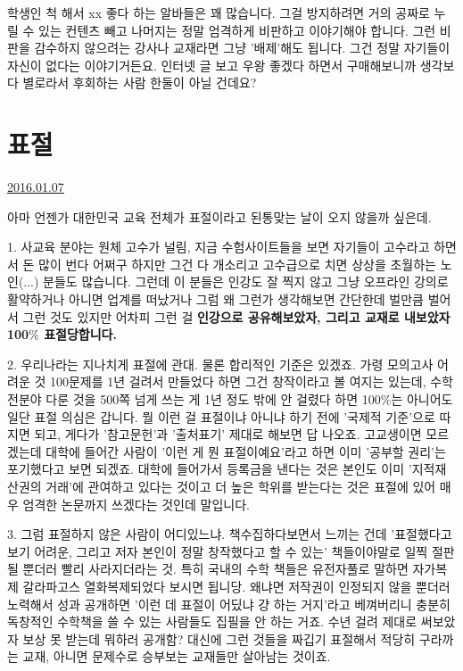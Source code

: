 학생인 척 해서 xx 좋다 하는 알바들은 꽤 많습니다.
그걸 방지하려면 거의 공짜로 누릴 수 있는 컨텐츠 빼고 나머지는 정말 엄격하게 비판하고 이야기해야 합니다.
그런 비판을 감수하지 않으려는 강사나 교재라면 그냥 '배제'해도 됩니다. 그건 정말 자기들이 자신이 없다는 이야기거든요.
인터넷 글 보고 우왕 좋겠다 하면서 구매해보니까 생각보다 별로라서 후회하는 사람 한둘이 아닐 건데요?
\vspace{5mm}








\section{표절}
\href{https://www.kockoc.com/Apoc/578553}{2016.01.07}

\vspace{5mm}

아마 언젠가 대한민국 교육 전체가 표절이라고 된통맞는 날이 오지 않을까 싶은데.
\vspace{5mm}

\item 1. 사교육 분야는 원체 고수가 널림,
지금 수험사이트들을 보면 자기들이 고수라고 하면서 돈 많이 번다 어쩌구 하지만 그건 다 개소리고
고수급으로 치면 상상을 초월하는 노인(...) 분들도 많습니다.
그런데 이 분들은 인강도 잘 찍지 않고 그냥 오프라인 강의로 활약하거나 아니면 업계를 떠났거나 그럼
왜 그런가 생각해보면 간단한데
벌만큼 벌어서 그런 것도 있지만
어차피 그런 걸 \textbf{인강으로 공유해보았자, 그리고 교재로 내보았자 100$\%$ 표절당합니다.}
\vspace{5mm}

\item 2. 우리나라는 지나치게 표절에 관대.
물론 합리적인 기준은 있겠죠.
가령 모의고사 어려운 것 100문제를 1년 걸려서 만들었다 하면 그건 창작이라고 볼 여지는 있는데,
수학 전분야 다룬 것을 500쪽 넘게 쓰는 게 1년 정도 밖에 안 걸렸다 하면 100$\%$는 아니어도 일단 표절 의심은 갑니다.
뭘 이런 걸 표절이냐 아니냐 하기 전에 '국제적 기준'으로 따지면 되고, 게다가 '참고문헌'과 '출처표기' 제대로 해보면 답 나오죠.
고교생이면 모르겠는데 대학에 들어간 사람이 '이런 게 뭔 표절이예요'라고 하면 이미 '공부할 권리'는 포기했다고 보면 되겠죠.
대학에 들어가서 등록금을 낸다는 것은 본인도 이미 '지적재산권의 거래'에 관여하고 있다는 것이고
더 높은 학위를 받는다는 것은 표절에 있어 매우 엄격한 논문까지 쓰겠다는 것인데 말입니다.
\vspace{5mm}

\item 3. 그럼 표절하지 않은 사람이 어디있느냐.
책수집하다보면서 느끼는 건데 '표절했다고 보기 어려운, 그리고 저자 본인이 정말 창작했다고 할 수 있는' 책들이야말로
일찍 절판될 뿐더러 빨리 사라지더라는 것. 특히 국내의 수학 책들은 유전자풀로 말하면 자가복제 갈라파고스 열화복제되었다 보시면 됩니당.
왜냐면 저작권이 인정되지 않을 뿐더러 노력해서 성과 공개하면 '이런 데 표절이 어딨냐 걍 하는 거지'라고 베껴버리니
충분히 독창적인 수학책을 쓸 수 있는 사람들도 집필을 안 하는 거죠. 수년 걸려 제대로 써보았자 보상 못 받는데 뭐하러 공개함?
대신에 그런 것들을 짜깁기 표절해서 적당히 구라까는 교재, 아니면 문제수로 승부보는 교재들만 살아남는 것이죠.
\vspace{5mm}

